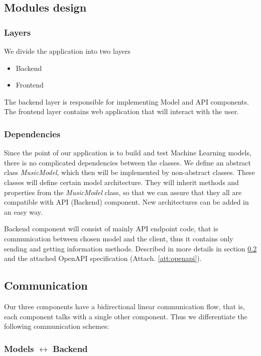\documentclass{article}
\begin{document}
\subsection{Modules design}
\subsubsection{Layers}
We divide the application into two layers
\begin{itemize}
    \item Backend
    \item Frontend
\end{itemize}
The backend layer is responsible for implementing Model and API components. The frontend layer contains web application that will interact with the user.

\subsubsection{Dependencies}
Since the point of our application is to build and test Machine Learning models, there is no complicated dependencies between the classes. We define an abstract class \textit{MusicModel}, which then will be implemented by non-abstract classes. These classes will define certain model architecture. They will inherit methods and properties from the \textit{MusicModel} class, so that we can assure that they all are compatible with API (Backend) component. New architectures can be added in an easy way.

Backend component will consist of mainly API endpoint code, that is communication between chosen model and the client, thus it contains only sending and getting information methods. Described in more details in section \ref{sec:communication} and the attached OpenAPI specification (Attach. \ref{att:openapi}).



\subsection{Communication} \label{sec:communication} %

Our three components have a bidirectional linear communication flow, that is, each component talks with a single other component. Thus we differentiate the following communication schemes:

\subsubsection{Models \texorpdfstring{$\leftrightarrow$}{<->} Backend}
\end{document}
